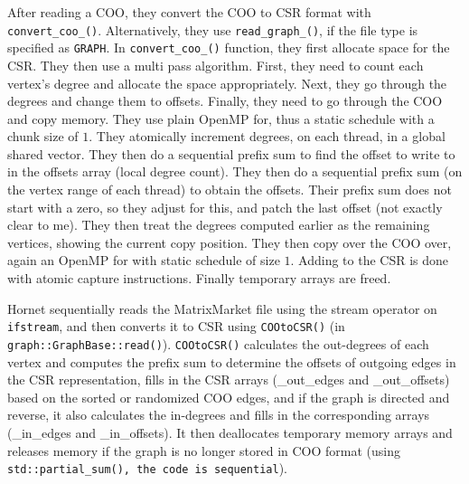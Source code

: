 After reading a COO, they convert the COO to CSR format with \texttt{convert\_coo\_()}. Alternatively, they use \texttt{read\_graph\_()}, if the file type is specified as \texttt{GRAPH}. In \texttt{convert\_coo\_()} function, they first allocate space for the CSR. They then use a multi pass algorithm. First, they need to count each vertex's degree and allocate the space appropriately. Next, they go through the degrees and change them to offsets. Finally, they need to go through the COO and copy memory. They use plain OpenMP for, thus a static schedule with a chunk size of $1$. They atomically increment degrees, on each thread, in a global shared vector. They then do a sequential prefix sum to find the offset to write to in the offsets array (local degree count). They then do a sequential prefix sum (on the vertex range of each thread) to obtain the offsets. Their prefix sum does not start with a zero, so they adjust for this, and patch the last offset (not exactly clear to me). They then treat the degrees computed earlier as the remaining vertices, showing the current copy position. They then copy over the COO over, again an OpenMP for with static schedule of size $1$. Adding to the CSR is done with atomic capture instructions. Finally temporary arrays are freed.

Hornet sequentially reads the MatrixMarket file using the stream operator on \texttt{ifstream}, and then converts it to CSR using \texttt{COOtoCSR()} (in \texttt{graph::GraphBase::read()}). \texttt{COOtoCSR()} calculates the out-degrees of each vertex and computes the prefix sum to determine the offsets of outgoing edges in the CSR representation, fills in the CSR arrays (\_out\_edges and \_out\_offsets) based on the sorted or randomized COO edges, and if the graph is directed and reverse, it also calculates the in-degrees and fills in the corresponding arrays (\_in\_edges and \_in\_offsets). It then deallocates temporary memory arrays and releases memory if the graph is no longer stored in COO format (using \texttt{std::partial\_sum(), the code is sequential}).

